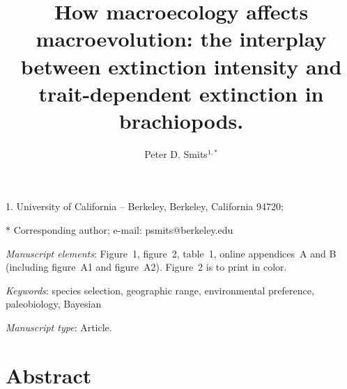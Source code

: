 \documentclass[11pt]{article}
\title{How macroecology affects macroevolution: the interplay between extinction intensity and trait-dependent extinction in brachiopods.}
\author{Peter D. Smits$^{1,\ast}$}
\date{}
\begin{document}
\maketitle

\noindent{} 1. University of California -- Berkeley, Berkeley, California 94720;

\noindent{} $\ast$ Corresponding author; e-mail: psmits@berkeley.edu

\bigskip

\textit{Manuscript elements}: Figure~1, figure~2, table~1, online appendices~A and B (including figure~A1 and figure~A2). Figure~2 is to print in color.

\bigskip

\textit{Keywords}: species selection, geographic range, environmental preference, paleobiology, Bayesian

\bigskip

\textit{Manuscript type}: Article. %

\bigskip



\newpage{}

\section*{Abstract}
\end{document}
